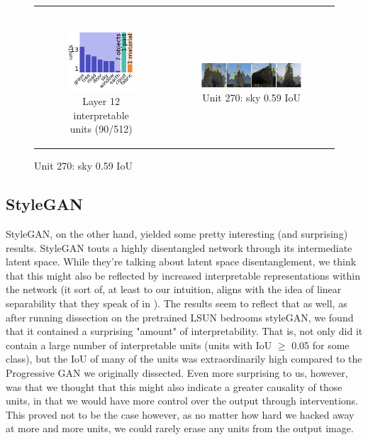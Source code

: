 \documentclass{article}
\begin{document}
\begin{figure}[h!]
\begin{tabular}{c c }
\begin{subfigure}[h!]{0.5\textwidth}
    \end{subfigure} \\
    \begin{subfigure}[h!]{0.3\textwidth}
        \caption{Layer 12 interpretable units (90/512)}
        \includegraphics[scale=0.5]{images/p2p_layer12.png}\hspace{2em}
    \end{subfigure} &
    \begin{subfigure}[h!]{0.5\textwidth}
        \caption{Unit 270: sky 0.59 IoU}
        \includegraphics[scale=0.25]{images/p2p_layer12_unit270_iou0.59.png}
    \end{subfigure} \\
\end{tabular}
\end{figure}

\newpage
\subsection{StyleGAN}
StyleGAN, on the other hand, yielded some pretty interesting (and surprising) results. StyleGAN touts a highly disentangled network through its intermediate latent space. While they're talking about latent space disentanglement, we think that this might also be reflected by increased interpretable representations within the network (it sort of, at least to our intuition, aligns with the idea of linear separability that they speak of in \cite{stylegan}). The results seem to reflect that as well, as after running dissection on the pretrained LSUN bedrooms styleGAN, we found that it contained a surprising "amount" of interpretability. That is, not only did it contain a large number of interpretable units (units with IoU $\geq$ 0.05 for some class), but the IoU of many of the units was extraordinarily high compared to the Progressive GAN we originally dissected. Even more surprising to us, however, was that we thought that this might also indicate a greater causality of those units, in that we would have more control over the output through interventions. This proved not to be the case however, as no matter how hard we hacked away at more and more units, we could rarely erase any units from the output image. 
\end{document}

